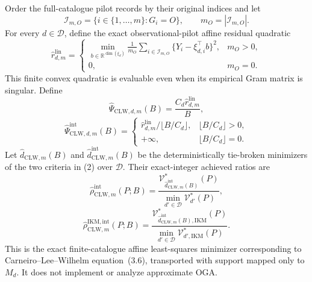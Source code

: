 Order the full-catalogue pilot records by their original indices and let
\[
 \mathcal I_{m,O}=\{i\in\{1,\ldots,m\}:G_i=O\},
 \qquad m_O=|\mathcal I_{m,O}|.
\]
For every \(d\in\mathcal D\), define the exact observational-pilot affine residual quadratic
\[
 \widehat r_{d,m}^{\mathrm{lin}}=
 \begin{cases}
 \displaystyle
 \min_{b\in\mathbb R^{\dim(\xi_d)}}
 \frac1{m_O}\sum_{i\in\mathcal I_{m,O}}
 \{Y_i-\xi_{d,i}^\top b\}^2,&m_O>0,\\[6pt]
 0,&m_O=0.
 \end{cases}                                                \tag{1}
\]
This finite convex quadratic is evaluable even when its empirical Gram matrix is singular.  Define
\[
 \widehat\Psi_{\mathrm{CLW},d,m}(B)
 =\frac{C_d\widehat r_{d,m}^{\mathrm{lin}}}{B},
\]
\[
 \widehat\Psi_{\mathrm{CLW},d,m}^{\mathrm{int}}(B)=
 \begin{cases}
 \widehat r_{d,m}^{\mathrm{lin}}/\lfloor B/C_d\rfloor,
 &\lfloor B/C_d\rfloor>0,\\
 +\infty,&\lfloor B/C_d\rfloor=0.
 \end{cases}                                                \tag{2}
\]
Let \(\widehat d_{\mathrm{CLW},m}(B)\) and
\(\widehat d_{\mathrm{CLW},m}^{\mathrm{int}}(B)\) be the deterministically tie-broken minimizers of the two criteria in (2) over \(\mathcal D\).  Their exact-integer achieved ratios are
\[
 \widehat\rho_{\mathrm{CLW},m}^{\mathrm{int}}(P;B)=
 \frac{\mathcal V_{\widehat d_{\mathrm{CLW},m}^{\mathrm{int}}(B)}^*(P)}
 {\min_{d'\in\mathcal D}\mathcal V_{d'}^*(P)},
\]
\[
 \widehat\rho_{\mathrm{CLW},m}^{\mathrm{IKM,int}}(P;B)=
 \frac{\mathcal V_{\widehat d_{\mathrm{CLW},m}^{\mathrm{int}}(B),\mathrm{IKM}}^*(P)}
 {\min_{d'\in\mathcal D}\mathcal V_{d',\mathrm{IKM}}^*(P)}. \tag{3}
\]
This is the exact finite-catalogue affine least-squares minimizer corresponding to Carneiro--Lee--Wilhelm equation~(3.6), transported with support mapped only to \(M_d\).  It does not implement or analyze approximate OGA.